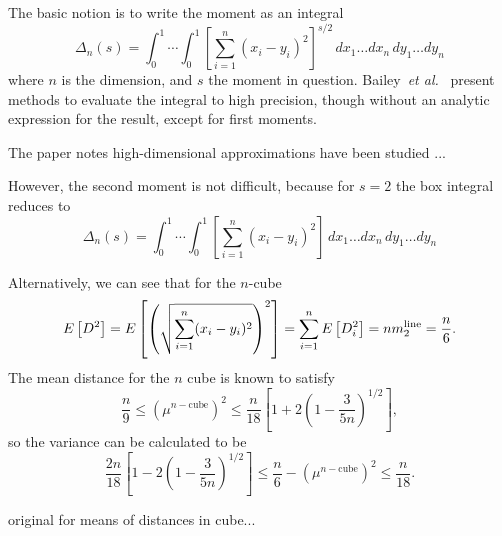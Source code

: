 The basic notion is to write the moment as an integral
\begin{equation}
  \label{eq:moment_n_cube}
  \Delta_n(s) = \int_0^1 \cdots \int_0^1
        \left[ \sum_{i=1}^n (x_i - y_i)^2 \right]^{s/2}
        \, dx_1 \ldots  dx_n   \, dy_1 \ldots  dy_n  
\end{equation}
where $n$ is the dimension, and $s$ the moment in
question. Bailey~{\em et al.}~\cite{Bailey2007196} present methods to
evaluate the integral to high precision, though without an analytic
expression for the result, except for first moments. 




The paper notes high-dimensional approximations have been studied ...



However, the second moment is not difficult, because for $s=2$ the box
integral reduces to 
\begin{equation}
  \label{eq:moment_n_cube}
  \Delta_n(s) = \int_0^1 \cdots \int_0^1
        \left[ \sum_{i=1}^n (x_i - y_i)^2 \right]
        \, dx_1 \ldots  dx_n   \, dy_1 \ldots  dy_n  
\end{equation}

Alternatively, we can see that for the $n$-cube
\begin{equation}
  E\left[ D^2 \right]
           = E\left[ \left( \sqrt{\sum_{i=1}^n (x_i - y_i)^2} \right)^2 \right]
           = \sum_{i=1}^n E\left[ D_i^2 \right]
           = n  m_2^{\rm line}
           = \frac{n}{6}.
\end{equation}
The mean distance for the $n$ cube is known to satisfy~\cite{anderssen76:_concer,weisstein:_cube_line_picking} 
\begin{equation}
  \frac{n}{9} \leq \left( \mu^{n-\mbox{cube}} \right)^2
                    \leq  \frac{n}{18} 
                               \left[ 1 + 2 \left(1-\frac{3}{5n}\right)^{1/2} \right]
                        ,
\end{equation}
so the variance can be calculated to be
\begin{equation}
  \frac{2n}{18}\left[ 1 - 2 \left(1-\frac{3}{5n}\right)^{1/2} \right]
        \leq \frac{n}{6} - \left( \mu^{n-\mbox{cube}} \right)^2
        \leq \frac{n}{18}.
\end{equation}


original for means of distances in cube...
\cite{anderssen76:_concer}